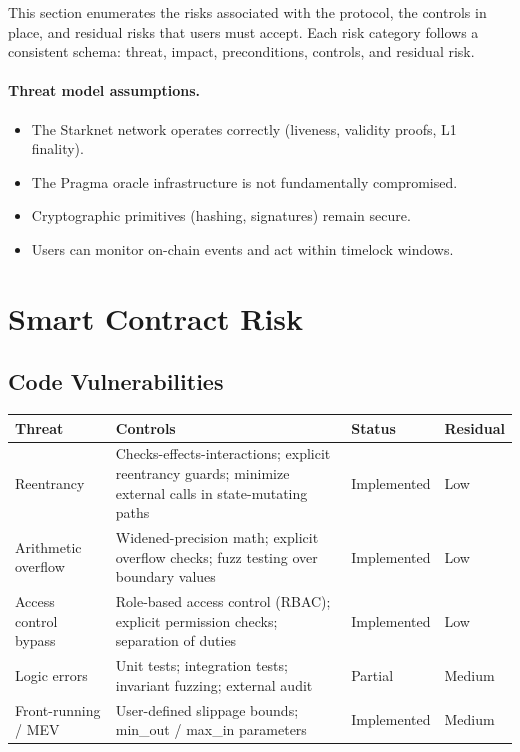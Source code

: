 
This section enumerates the risks associated with the protocol, the controls in place, and residual risks that users must accept. Each risk category follows a consistent schema: threat, impact, preconditions, controls, and residual risk.

\paragraph{Threat model assumptions.}
\begin{itemize}
\item The Starknet network operates correctly (liveness, validity proofs, L1 finality).
\item The Pragma oracle infrastructure is not fundamentally compromised.
\item Cryptographic primitives (hashing, signatures) remain secure.
\item Users can monitor on-chain events and act within timelock windows.
\end{itemize}

\section{Smart Contract Risk}

\subsection{Code Vulnerabilities}

\begin{center}
\begin{tabularx}{\textwidth}{l >{\raggedright\arraybackslash}X l l}
\toprule
\textbf{Threat} & \textbf{Controls} & \textbf{Status} & \textbf{Residual} \\
\midrule
Reentrancy & Checks-effects-interactions; explicit reentrancy guards; minimize external calls in state-mutating paths & Implemented & Low \\
Arithmetic overflow & Widened-precision math; explicit overflow checks; fuzz testing over boundary values & Implemented & Low \\
Access control bypass & Role-based access control (RBAC); explicit permission checks; separation of duties & Implemented & Low \\
Logic errors & Unit tests; integration tests; invariant fuzzing; external audit & Partial & Medium \\
Front-running / MEV & User-defined slippage bounds; min\_out / max\_in parameters & Implemented & Medium \\
\bottomrule
\end{tabularx}
\end{center}

